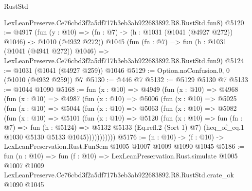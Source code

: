 \begin{lexlean}{RustStd}
\begin{coremodule}
    LexLeanPreserve.Ce76cbd3f2a5df717b3eb3ab922683892.R8.RustStd.fun8)
@5120 := @4917
    (fun (y : @10) => (fn : @7) -> (h : @1031 (@1041 (@4927 @272)) @1046) -> @1010 (@4932 @272))
    @1045
    (fun (fn : @7) =>
    fun (h : @1031 (@1041 (@4941 @272)) @1046) =>
    LexLeanPreserve.Ce76cbd3f2a5df717b3eb3ab922683892.R8.RustStd.fun9)
@5124 := @1031 (@1041 (@4927 @259)) @1046
@5129 := Option.noConfusion.{0, 0} (@1010 (@4932 @259)) @7
@5130 := @446 @7
@5132 := @5129 @5130 @7
@5133 := @1044 @1090
@5168 := fun (x : @10) =>
  @4949
    (fun (x : @10) =>
    @4968
      (fun (x : @10) =>
      @4987
        (fun (x : @10) =>
        @5006
          (fun (x : @10) =>
          @5025
            (fun (x : @10) =>
            @5044
              (fun (x : @10) =>
              @5063
                (fun (x : @10) =>
                @5082
                  (fun (x : @10) =>
                  @5101
                    (fun (x : @10) =>
                    @5120
                      (fun (x : @10) =>
                      fun (fn : @7) =>
                      fun (h : @5124) =>
                      @5132
                        @5133
                        (Eq.refl.{2} (Sort 1) @7)
                        (heq_of_eq.{1} @1030 @5130 @5133 @1045)))))))))))
@5176 := (n : @10) -> (f : @10) -> LexLeanPreservation.Rust.FunSem @1005 @1007 @1009 @1090 @1045
@5186 := fun (n : @10) =>
  fun (f : @10) =>
  LexLeanPreservation.Rust.simulate
    @1005
    @1007
    @1009
    LexLeanPreserve.Ce76cbd3f2a5df717b3eb3ab922683892.R8.RustStd.crate_ok
    @1090
    @1045
\end{coremodule}
\end{lexlean}
